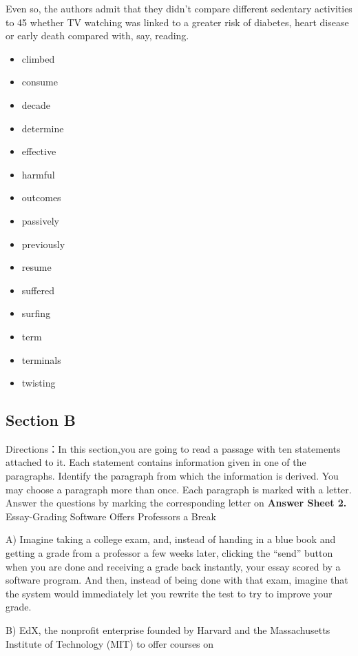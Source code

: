 \documentclass[UTF8,11pt]{ctexart}
\begin{document}
Even so, the authors admit that they didn’t compare different sedentary activities to 45 whether TV watching was linked to a greater risk of diabetes, heart disease or early death compared with, say, reading.


\begin{itemize}[leftmargin=2em,itemsep=.2em,topsep=.4em]\item[A.] climbed
\item[B.] consume
\item[C.] decade
\item[D.] determine
\item[E.] effective
\item[F.] harmful
\item[G.] outcomes
\item[H.] passively
\item[I.] previously
\item[J.] resume
\item[K.] suffered
\item[L.] surfing
\item[M.] term
\item[N.] terminals
\item[O.] twisting
\end{itemize}

\subsection*{Section B}


Directions：In this section,you are going to read a passage with ten statements attached to it. Each statement contains information given in one of the paragraphs. Identify the paragraph from which the information is derived. You may choose a paragraph more than once. Each paragraph is marked with a letter. Answer the questions by marking the corresponding letter on\textbf{ Answer Sheet 2.} Essay-Grading Software Offers Professors a Break


A) Imagine taking a college exam, and, instead of handing in a blue book and getting a grade from a professor a few weeks later, clicking the “send” button when you are done and receiving a grade back instantly, your essay scored by a software program. And then, instead of being done with that exam, imagine that the system would immediately let you rewrite the test to try to improve your grade.


B) EdX, the nonprofit enterprise founded by Harvard and the Massachusetts Institute of Technology (MIT) to offer courses on
\end{document}
